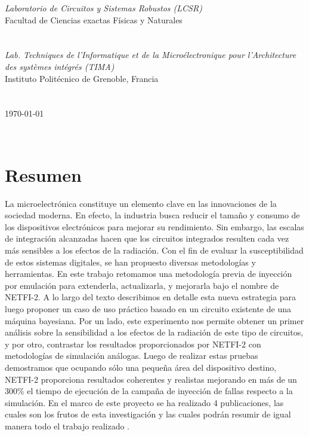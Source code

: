 \documentclass[a4paper,openright,12pt]{report}
\begin{document}
\begin{titlepage}
\begin{center}
\large \textit{Laboratorio de Circuitos y Sistemas Robustos (LCSR)}\\ Facultad de Ciencias exactas Físicas y Naturales
\large \textit{}\\
\large \textit{}\\
\large \textit{}\\
\large \textit{ Lab. Techniques de l'Informatique et de la Microélectronique pour l'Architecture des systèmes intégrés (TIMA)}\\ Instituto Politécnico de Grenoble, Francia
 \large \textit{}\\
  \large \textit{}\\
   \large \textit{}\\
{\large \today}\\[2cm] %
 
\vfill
\end{center}
\end{titlepage}


$\ $
\thispagestyle{empty} %
% 



\chapter*{Resumen} %
La microelectrónica constituye un elemento clave en las innovaciones de la sociedad moderna. En efecto, la industria busca reducir el tamaño y consumo de los dispositivos electrónicos para mejorar su rendimiento. Sin embargo, las escalas de integración alcanzadas hacen que los circuitos integrados resulten cada vez más sensibles a los efectos de la radiación. Con el fin de evaluar la susceptibilidad de estos sistemas digitales, se han propuesto diversas metodologías y herramientas. En este trabajo retomamos una metodología previa de inyección por emulación para extenderla, actualizarla, y mejorarla bajo el nombre de NETFI-2. A lo largo del texto describimos en detalle esta nueva estrategia para luego proponer un caso de uso práctico basado en un circuito existente de una máquina bayesiana. Por un lado, este experimento nos permite obtener un primer análisis sobre la sensibilidad a los efectos de la radiación de este tipo de circuitos, y por otro, contrastar los resultados proporcionados por NETFI-2 con metodologías de simulación análogas. Luego de realizar estas pruebas demostramos que ocupando sólo una pequeña área del dispositivo destino, NETFI-2 proporciona resultados coherentes y realistas mejorando en más de un 300\% el tiempo de ejecución de la campaña de inyección de fallas respecto a la simulación. En el marco de este proyecto se ha realizado 4 publicaciones, las cuales son los frutos de esta investigación y las cuales podrán resumir de igual manera todo el trabajo realizado \cite{SanLuis} \cite{Alemania} \cite{Alemania2} \cite{Bariloche}.
\end{document}
